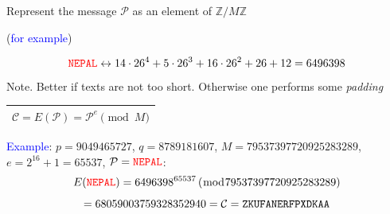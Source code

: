 \documentclass[landscape]{powersem} %
\newcommand{\psd}{\pause}%
\newcommand{\heading}[1]{%
 \begin{center}
  \large\bf
  \Ovalbox{{\textcolor{conceptcolor}{#1}}}%
 \end{center}
 \vspace{1ex minus 1ex}}
\begin{document}
\begin{slide}
\heading{Alice: Encryption}\psd

Represent the message ${\mathcal P}$ as an element of  ${\mathbb Z}/M{\mathbb Z}$\psd

(\textcolor{blue}{for example})\psd
\begin{scriptsize}
%
%
%


$$\texttt{\textcolor{red}{NEPAL}}\leftrightarrow
14\cdot26^4+5\cdot26^3+16\cdot26^2+26+12=6496398$$ Note. Better if
texts are not too short. Otherwise one performs some
\textsl{padding}
\end{scriptsize}\psd

\begin{Large}
\begin{center}\begin{tabular}{|c|}\hline
${\mathcal C}=E({\mathcal P})={\mathcal P}^e\pmod M$\\\hline\end{tabular}\end{center}
\end{Large}\psd

\scriptsize{ \textcolor{blue}{Example}: $p=9049465727$,
$q=8789181607$, $M=79537397720925283289 $, $e=2^{16}+1=65537$,
${\mathcal P}=\texttt{\textcolor{red}{NEPAL}}$:\psd
$$E(\texttt{\textcolor{red}{NEPAL}})=6496398^{65537}\,(\bmod 79537397720925283289)$$
$$=68059003759328352940={\mathcal C}=\texttt{\textcolor{black}{ZKUFANERFPXDKAA}}\hfill$$}
\end{slide}
\end{document}
